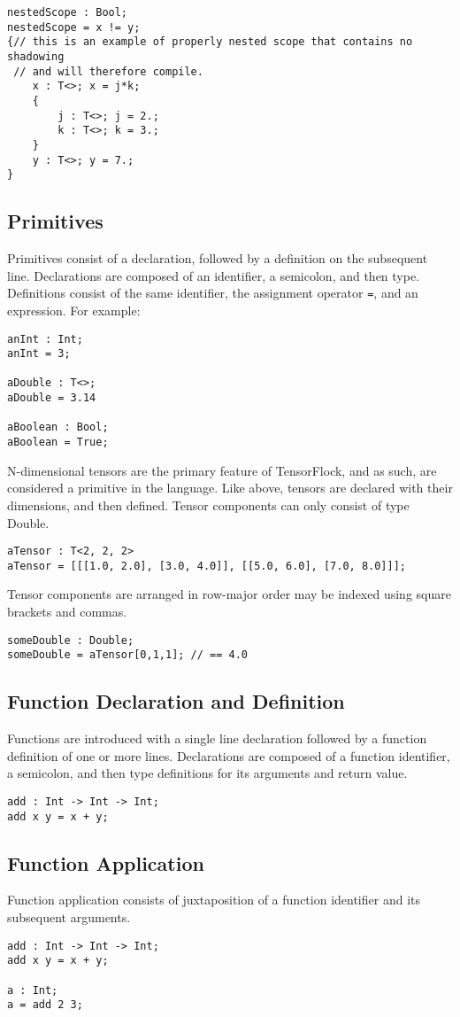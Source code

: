 \begin{lstlisting}
nestedScope : Bool;
nestedScope = x != y;
{// this is an example of properly nested scope that contains no shadowing
 // and will therefore compile.
    x : T<>; x = j*k;
    { 
        j : T<>; j = 2.;
        k : T<>; k = 3.;
    }
    y : T<>; y = 7.;
}    
\end{lstlisting}

\subsection{Primitives}
Primitives consist of a declaration, followed by a definition on the subsequent line. 
Declarations are composed of an identifier, a semicolon, and then type. 
Definitions consist of the same identifier, the assignment operator \lstinline|=|, 
and an expression. For example:
\begin{lstlisting}
anInt : Int;
anInt = 3;

aDouble : T<>;
aDouble = 3.14

aBoolean : Bool;
aBoolean = True;
\end{lstlisting}

N-dimensional tensors are the primary feature of TensorFlock, and as such, 
are considered a primitive in the language. Like above, tensors are declared 
with their dimensions, and then defined. Tensor components can only consist of type Double. 
\begin{lstlisting}
aTensor : T<2, 2, 2>
aTensor = [[[1.0, 2.0], [3.0, 4.0]], [[5.0, 6.0], [7.0, 8.0]]];
\end{lstlisting}
Tensor components are arranged in row-major order may be indexed using square
brackets and commas.
\begin{lstlisting}
someDouble : Double;
someDouble = aTensor[0,1,1]; // == 4.0
\end{lstlisting}
\subsection{Function Declaration and Definition}
Functions are introduced with a single line declaration followed by a function definition of 
one or more lines. Declarations are composed of a function identifier, a semicolon, 
and then type definitions for its arguments and return value.
\begin{lstlisting}
add : Int -> Int -> Int;
add x y = x + y;
\end{lstlisting}
\subsection{Function Application}
Function application consists of juxtaposition of a function identifier and its 
subsequent arguments.
\begin{lstlisting}
add : Int -> Int -> Int;
add x y = x + y;

a : Int;
a = add 2 3;
\end{lstlisting}


